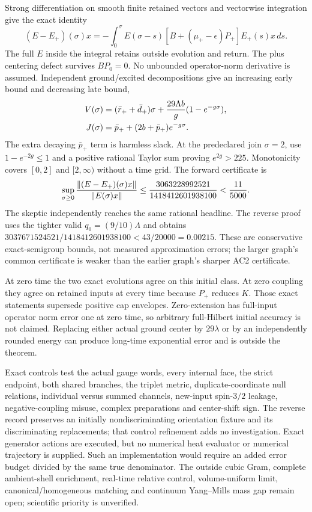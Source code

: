 Strong differentiation on smooth finite retained vectors and vectorwise integration give the exact identity
\begin{equation}
 (E-E_+)(\sigma)x=-\int_0^\sigma E(\sigma-s)
 [B+(\mu_+-\epsilon)P_+]E_+(s)x\,ds.
 \label{eq:ah1-duhamel}
\end{equation}
The full $E$ inside the integral retains outside evolution and return. The plus centering defect survives $BP_0=0$. No unbounded operator-norm derivative is assumed. Independent ground/excited decompositions give an increasing early bound and decreasing late bound,
\begin{align}
 V(\sigma)&=(\bar r_++\bar d_+)\sigma
       +\frac{29\Lambda b}{g}(1-e^{-g\sigma}),\notag\\
 J(\sigma)&=\bar p_++(2b+\bar p_+)e^{-g\sigma}.
 \label{eq:ah1-join-bounds}
\end{align}
The extra decaying $\bar p_+$ term is harmless slack. At the predeclared join $\sigma=2$, use $1-e^{-2g}\le1$ and a positive rational Taylor sum proving $e^{2g}>225$. Monotonicity covers $[0,2]$ and $[2,\infty)$ without a time grid. The forward certificate is
\begin{equation}
 \sup_{\sigma\ge0}
 \frac{\left\lVert(E-E_+)(\sigma)x\right\rVert}{\left\lVert E(\sigma)x\right\rVert}
 \le\frac{3063228992521}{1418412601938100}
 <\frac{11}{5000}.
 \label{eq:ah1-main-bound}
\end{equation}
The skeptic independently reaches the same rational headline. The reverse proof uses the tighter valid $q_0=(9/10)\Lambda$ and obtains
$3037671524521/1418412601938100<43/20000=0.00215$.
These are conservative exact-semigroup bounds, not measured approximation errors; the larger graph's common certificate is weaker than the earlier graph's sharper AC2 certificate.

At zero time the two exact evolutions agree on this initial class. At zero coupling they agree on retained inputs at every time because $P_+$ reduces $K$. Those exact statements supersede positive cap envelopes. Zero-extension has full-input operator norm error one at zero time, so arbitrary full-Hilbert initial accuracy is not claimed. Replacing either actual ground center by $29\lambda$ or by an independently rounded energy can produce long-time exponential error and is outside the theorem.

Exact controls test the actual gauge words, every internal face, the strict endpoint, both shared branches, the triplet metric, duplicate-coordinate null relations, individual versus summed channels, new-input spin-$3/2$ leakage, negative-coupling misuse, complex preparations and center-shift sign. The reverse record preserves an initially nondiscriminating orientation fixture and its discriminating replacements; that control refinement adds no investigation. Exact generator actions are executed, but no numerical heat evaluator or numerical trajectory is supplied. Such an implementation would require an added error budget divided by the same true denominator. The outside cubic Gram, complete ambient-shell enrichment, real-time relative control, volume-uniform limit, canonical/homogeneous matching and continuum Yang--Mills mass gap remain open; scientific priority is unverified.
